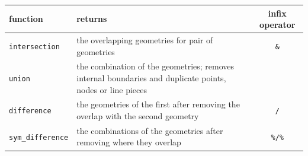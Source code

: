 \documentclass[]{book}
\begin{document}
\begin{longtable}[]{@{}llc@{}}
\toprule
\begin{minipage}[b]{0.19\columnwidth}\raggedright
function\strut
\end{minipage} & \begin{minipage}[b]{0.59\columnwidth}\raggedright
returns\strut
\end{minipage} & \begin{minipage}[b]{0.14\columnwidth}\centering
infix operator\strut
\end{minipage}\tabularnewline
\midrule
\endhead
\begin{minipage}[t]{0.19\columnwidth}\raggedright
\texttt{intersection}\strut
\end{minipage} & \begin{minipage}[t]{0.59\columnwidth}\raggedright
the overlapping geometries for pair of geometries\strut
\end{minipage} & \begin{minipage}[t]{0.14\columnwidth}\centering
\texttt{\&}\strut
\end{minipage}\tabularnewline
\begin{minipage}[t]{0.19\columnwidth}\raggedright
\texttt{union}\strut
\end{minipage} & \begin{minipage}[t]{0.59\columnwidth}\raggedright
the combination of the geometries; removes internal boundaries and duplicate points, nodes or line pieces\strut
\end{minipage} & \begin{minipage}[t]{0.14\columnwidth}\centering
\texttt{\textbar{}}\strut
\end{minipage}\tabularnewline
\begin{minipage}[t]{0.19\columnwidth}\raggedright
\texttt{difference}\strut
\end{minipage} & \begin{minipage}[t]{0.59\columnwidth}\raggedright
the geometries of the first after removing the overlap with the second geometry\strut
\end{minipage} & \begin{minipage}[t]{0.14\columnwidth}\centering
\texttt{/}\strut
\end{minipage}\tabularnewline
\begin{minipage}[t]{0.19\columnwidth}\raggedright
\texttt{sym\_difference}\strut
\end{minipage} & \begin{minipage}[t]{0.59\columnwidth}\raggedright
the combinations of the geometries after removing where they overlap\strut
\end{minipage} & \begin{minipage}[t]{0.14\columnwidth}\centering
\texttt{\%/\%}\strut
\end{minipage}\tabularnewline
\bottomrule
\end{longtable}
\end{document}
